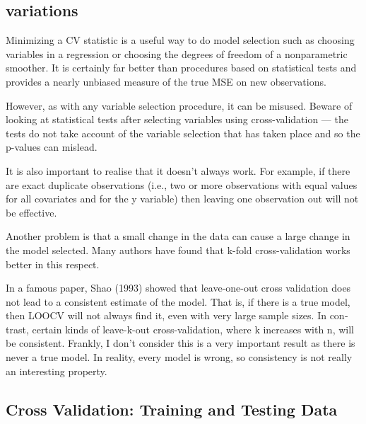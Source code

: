 \documentclass[]{report}
\begin{document}
\subsection{variations}

Min­i­miz­ing a CV sta­tis­tic is a use­ful way to do model selec­tion such as choos­ing vari­ables in a regres­sion or choos­ing the degrees of free­dom of a non­para­met­ric smoother. It is cer­tainly far bet­ter than pro­ce­dures based on sta­tis­ti­cal tests and pro­vides a nearly unbi­ased mea­sure of the true MSE on new observations.

How­ever, as with any vari­able selec­tion pro­ce­dure, it can be mis­used. Beware of look­ing at sta­tis­ti­cal tests after select­ing vari­ables using cross-​​validation — the tests do not take account of the vari­able selec­tion that has taken place and so the p-​​values can mislead.

It is also impor­tant to realise that it doesn’t always work. For exam­ple, if there are exact dupli­cate obser­va­tions (i.e., two or more obser­va­tions with equal val­ues for all covari­ates and for the y vari­able) then leav­ing one obser­va­tion out will not be effective.

Another prob­lem is that a small change in the data can cause a large change in the model selected. Many authors have found that k-​​fold cross-​​validation works bet­ter in this respect.

In a famous paper, Shao (1993) showed that leave-​​one-​​out cross val­i­da­tion does not lead to a con­sis­tent esti­mate of the model. That is, if there is a true model, then LOOCV will not always find it, even with very large sam­ple sizes. In con­trast, cer­tain kinds of leave-​​k-​​out cross-​​validation, where k increases with n, will be con­sis­tent. Frankly, I don’t con­sider this is a very impor­tant result as there is never a true model. In real­ity, every model is wrong, so con­sis­tency is not really an inter­est­ing property.

\newpage
\subsection{Cross Validation: Training and Testing Data}
\end{document}
